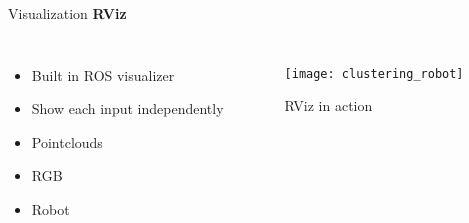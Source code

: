 \begin{frame}{Visualization}
\textbf{RViz}
  \begin{columns}[c] %
     \begin{itemize}
	\item Built in ROS visualizer
	\item Show each input independently
	\item Pointclouds 
	\item RGB
	\item Robot
	\end{itemize}
    \begin{figure}[H]
	\begin{center}
	\texttt{[image: clustering\_robot]}
	\caption{RViz in action}
	\end{center}
	\end{figure}
    \end{columns}
\end{frame}


